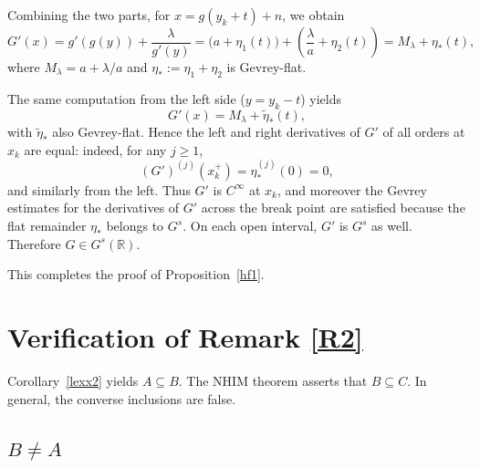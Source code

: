 \documentclass{amsart}
\newtheorem{Remark}[Theorem]{Remark}
\begin{document}
	Combining the two parts, for \(x=g(y_k+t)+n\), we obtain
	\[
	G'(x)=g'(g(y))+\frac{\lambda}{g'(y)}
	= \bigl(a+\eta_1(t)\bigr)+\left(\frac{\lambda}{a}+\eta_2(t)\right)
	= M_\lambda + \eta_*(t),
	\]
	where \(M_\lambda=a+\lambda/a\) and \(\eta_*:=\eta_1+\eta_2\) is Gevrey-flat.
	
	The same computation from the left side (\(y=y_k-t\)) yields
	\[
	G'(x)=M_\lambda+\tilde\eta_*(t),
	\]
	with \(\tilde\eta_*\) also Gevrey-flat. Hence the left and right derivatives of \(G'\) of all orders at \(x_k\) are equal: indeed, for any \(j\ge1\),
	\[
	(G')^{(j)}(x_k^+)=\eta_*^{(j)}(0)=0,
	\]
	and similarly from the left. Thus \(G'\) is \(C^\infty\) at \(x_k\), and moreover the Gevrey estimates for the derivatives of \(G'\) across the break point are satisfied because the flat remainder \(\eta_*\) belongs to \(G^s\). On each open interval, \(G'\) is \(G^s\) as well. Therefore \(G\in G^s(\mathbb{R})\).
	
	\vspace{1ex}
	
	This completes the proof of Proposition~\ref{hf1}.
	
	
	
	
	
	
	\vspace{1em}
	
	\section{\sc Verification of Remark \ref{R2}}\label{R3}
	Corollary~\ref{lexx2} yields \(A \subseteq B\). The NHIM theorem asserts that \(B \subseteq C\). In general, the converse inclusions are false.
	
	\subsection{\(B \neq A\)}
	
\end{document}
